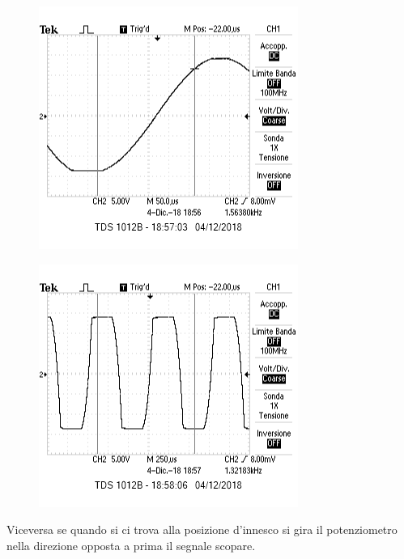 \documentclass{article}
\begin{document}
	\begin{figure}[htb]
	    \begin{minipage}[t]{.5\linewidth}
	        \centering
			\includegraphics[width=\linewidth]{figure/clipping1.png}
			\label{fig:clipping1}
	    \end{minipage}
	    \begin{minipage}[t]{.5\linewidth}
	        \centering
			\includegraphics[width=\linewidth]{figure/clipping2.png}
			\label{fig:clipping2}
	    \end{minipage}
	\end{figure}
	Viceversa se quando si ci trova alla posizione d'innesco si gira il potenziometro nella direzione opposta a prima il segnale scopare.
\end{document}
